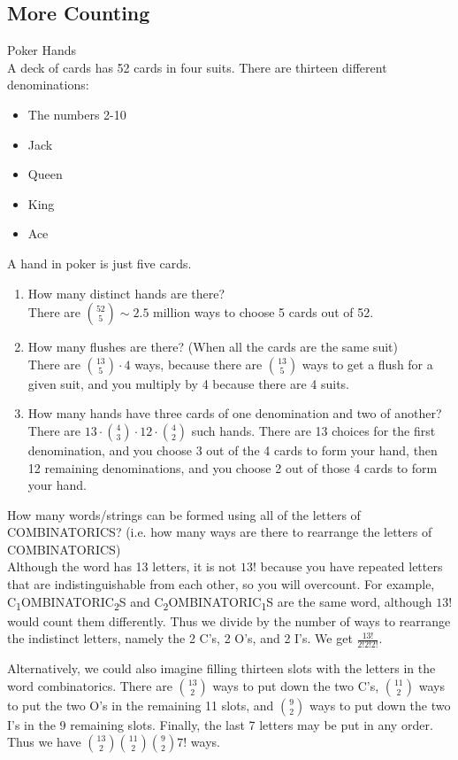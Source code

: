 \documentclass[class=article, crop=false]{standalone}
\begin{document}
  \subsection{More Counting}
  \begin{example}{Poker Hands}\\
    A deck of cards has 52 cards in four suits. There are thirteen different denominations:
    \begin{itemize}
      \item The numbers 2-10
      \item Jack
      \item Queen
      \item King
      \item Ace
    \end{itemize}
    A hand in poker is just five cards.
    \begin{enumerate}[label=(\alph*)]
      \item How many distinct hands are there? \\[10pt]
      There are $\binom{52}{5} \sim 2.5$ million ways to choose 5 cards out of 52.
      \item How many flushes are there? (When all the cards are the same suit)\\[10pt]
      There are $\binom{13}{5} \cdot 4$ ways, because there are $\binom{13}{5}$ ways to get a flush for a given suit, and you multiply by 4 because there are 4 suits.
      \item How many hands have three cards of one denomination and two of another? \\[10pt]
      There are $13 \cdot \binom{4}{3} \cdot 12 \cdot \binom{4}{2}$ such hands. There are 13 choices for the first denomination, and you choose 3 out of the 4 cards to form your hand, then 12 remaining denominations, and you choose 2 out of those 4 cards to form your hand.
    \end{enumerate}
  \end{example}
  \begin{example}{}
    How many words/strings can be formed using all of the letters of COMBINATORICS? (i.e. how many ways are there to rearrange the letters of COMBINATORICS) \\[10pt]
    Although the word has 13 letters, it is not $13!$ because you have repeated letters that are indistinguishable from each other, so you will overcount. For example, C\textsubscript{1}OMBINATORIC\textsubscript{2}S and C\textsubscript{2}OMBINATORIC\textsubscript{1}S are the same word, although $13!$ would count them differently. Thus we divide by the number of ways to rearrange the indistinct letters, namely the 2 C's, 2 O's, and 2 I's. We get $\frac{13!}{2!2!2!}$.\par
    Alternatively, we could also imagine filling thirteen slots with the letters in the word combinatorics. There are $\binom{13}{2}$ ways to put down the two C's, $\binom{11}{2}$ ways to put the two O's in the remaining 11 slots, and $\binom{9}{2}$ ways to put down the two I's in the 9 remaining slots. Finally, the last 7 letters may be put in any order. Thus we have $\binom{13}{2}\binom{11}{2}\binom{9}{2}7!$ ways.
  \end{example}
\end{document}
